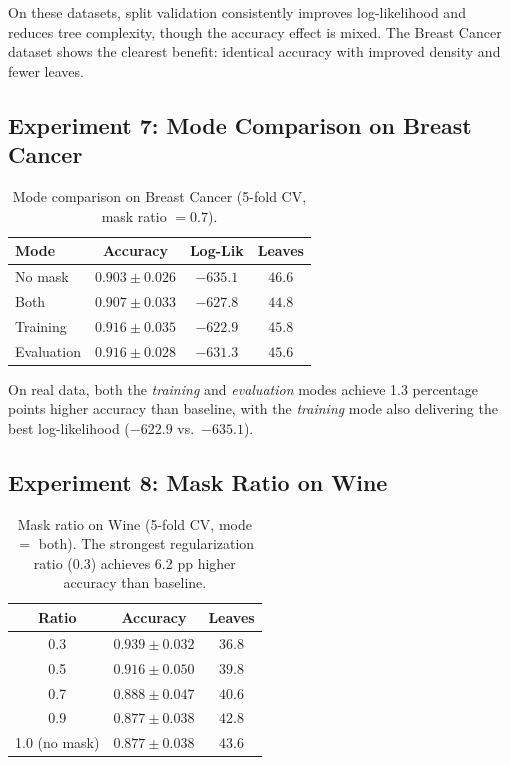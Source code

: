 \documentclass[11pt,a4paper]{article}
\begin{document}
On these datasets, split validation consistently improves log-likelihood and
reduces tree complexity, though the accuracy effect is mixed. The Breast Cancer
dataset shows the clearest benefit: identical accuracy with improved density and
fewer leaves.

\subsection{Experiment 7: Mode Comparison on Breast Cancer}

\begin{table}[h]
\centering
\caption{Mode comparison on Breast Cancer (5-fold CV, mask ratio $= 0.7$).}
\label{tab:exp7}
\begin{tabular}{lccc}
\toprule
Mode & Accuracy & Log-Lik & Leaves \\
\midrule
No mask     & $0.903 \pm 0.026$ & $-635.1$ & $46.6$ \\
Both        & $0.907 \pm 0.033$ & $\mathbf{-627.8}$ & $\mathbf{44.8}$ \\
Training    & $\mathbf{0.916 \pm 0.035}$ & $-622.9$ & $45.8$ \\
Evaluation  & $\mathbf{0.916 \pm 0.028}$ & $-631.3$ & $45.6$ \\
\bottomrule
\end{tabular}
\end{table}

On real data, both the \emph{training} and \emph{evaluation} modes achieve 1.3
percentage points higher accuracy than baseline, with the \emph{training} mode
also delivering the best log-likelihood ($-622.9$ vs.\ $-635.1$).

\subsection{Experiment 8: Mask Ratio on Wine}

\begin{table}[h]
\centering
\caption{Mask ratio on Wine (5-fold CV, mode $=$ both). The strongest
         regularization ratio (0.3) achieves 6.2 pp higher accuracy than
         baseline.}
\label{tab:exp8}
\begin{tabular}{ccc}
\toprule
Ratio & Accuracy & Leaves \\
\midrule
0.3 & $\mathbf{0.939 \pm 0.032}$ & $\mathbf{36.8}$ \\
0.5 & $0.916 \pm 0.050$ & $39.8$ \\
0.7 & $0.888 \pm 0.047$ & $40.6$ \\
0.9 & $0.877 \pm 0.038$ & $42.8$ \\
1.0 (no mask) & $0.877 \pm 0.038$ & $43.6$ \\
\bottomrule
\end{tabular}
\end{table}
\end{document}
